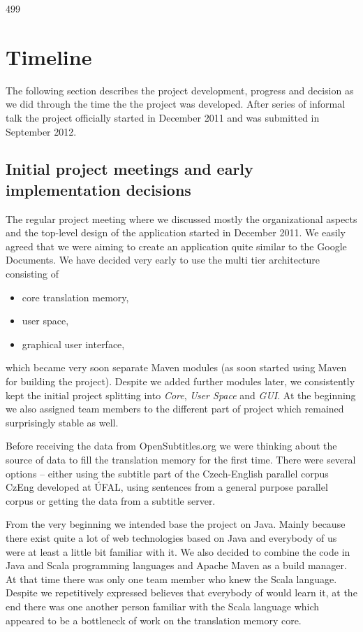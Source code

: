 499

\section{Timeline}

The following section describes the project development, progress and decision as we did through the time the the project was developed. After series of informal talk the project officially started in December 2011 and was submitted in September 2012.

\subsection{Initial project meetings and early implementation decisions}

The regular project meeting where we discussed mostly the organizational aspects and the top-level design of the application started in December 2011. We easily agreed that we were aiming to create an application quite similar to the Google Documents. We have decided very early to use the multi tier architecture consisting of

\begin{itemize}
\item core translation memory,
\item user space,
\item graphical user interface,
\end{itemize}

which became very soon separate Maven modules (as soon started using Maven for building the project). Despite we added further modules later, we consistently kept the initial project splitting into \emph{Core}, \emph{User Space} and \emph{GUI}. At the beginning we also assigned team members to the different part of project which remained surprisingly stable as well. 

Before receiving the data from OpenSubtitles.org we were thinking about the source of data to fill the translation memory for the first time. There were several options -- either using the subtitle part of the Czech-English parallel corpus CzEng developed at ÚFAL, using sentences from a general purpose parallel corpus or getting the data from a subtitle server.

From the very beginning we intended base the project on Java. Mainly because there exist quite a lot of web technologies based on Java and everybody of us were at least a little bit familiar with it. We also decided to combine the code in Java and Scala programming languages and Apache Maven as a build manager. At that time there was only one team member who knew the Scala language. Despite we repetitively expressed believes that everybody of would learn it, at the end there was one another person familiar with the Scala language which appeared to be a bottleneck of work on the translation memory core.

